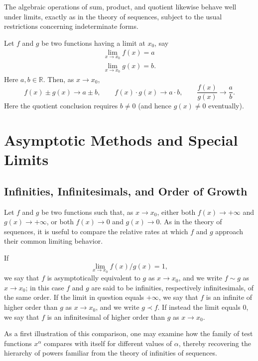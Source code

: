 The algebraic operations of sum, product, and quotient likewise behave well under limits, exactly as in the theory of sequences, subject to the usual restrictions concerning indeterminate forms.

\begin{theorem}
Let $f$ and $g$ be two functions having a limit at $x_0$, say
\[
\begin{gathered}
\lim_{x \to x_0} f(x) = a \\
\lim_{x \to x_0} g(x) = b.
\end{gathered}
\]
Here $a, b \in \mathbb{R}$. Then, as $x \to x_0$,
\[
f(x) \pm g(x) \to a \pm b, \qquad f(x) \cdot g(x) \to a \cdot b, \qquad \frac{f(x)}{g(x)} \to \frac{a}{b}.
\]
Here the quotient conclusion requires $b\neq0$ (and hence $g(x)\neq0$
eventually).
\end{theorem}

\section{Asymptotic Methods and Special Limits}

\subsection{Infinities, Infinitesimals, and Order of Growth}

Let $f$ and $g$ be two functions such that, as $x \to x_0$, either both $f(x) \to +\infty$ and $g(x) \to +\infty$, or both $f(x) \to 0$ and $g(x) \to 0$. As in the theory of sequences, it is useful to compare the relative rates at which $f$ and $g$ approach their common limiting behavior.

\begin{definition}
If \[
\lim_{x \to x_0} f(x)/g(x) = 1,
\] we say that $f$ is asymptotically equivalent to $g$ as $x \to x_0$, and we write $f \sim g$ as $x \to x_0$; in this case $f$ and $g$ are said to be infinities, respectively infinitesimals, of the same order. If the limit in question equals $+\infty$, we say that $f$ is an infinite of higher order than $g$ as $x \to x_0$, and we write $g \prec f$. If instead the limit equals $0$, we say that $f$ is an infinitesimal of higher order than $g$ as $x \to x_0$.
\end{definition}

As a first illustration of this comparison, one may examine how the family of test functions $x^\alpha$ compares with itself for different values of $\alpha$, thereby recovering the hierarchy of powers familiar from the theory of infinities of sequences.

